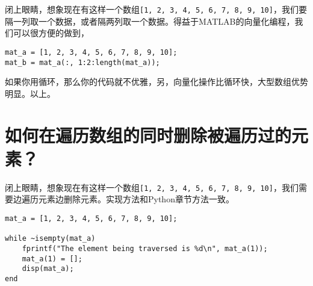 闭上眼睛，想象现在有这样一个数组\texttt{[1, 2, 3, 4, 5, 6, 7, 8, 9, 10]}，我们要隔一列取一个数据，或者隔两列取一个数据。得益于MATLAB的向量化编程，我们可以很方便的做到，

\begin{verbatim}
mat_a = [1, 2, 3, 4, 5, 6, 7, 8, 9, 10];
mat_b = mat_a(:, 1:2:length(mat_a));
\end{verbatim}

如果你用循环，那么你的代码就不优雅，另，向量化操作比循环快，大型数组优势明显。以上。

\section{如何在遍历数组的同时删除被遍历过的元素？}

闭上眼睛，想象现在有这样一个数组\texttt{[1, 2, 3, 4, 5, 6, 7, 8, 9, 10]}，我们需要边遍历元素边删除元素。实现方法和Python章节方法一致。

\begin{verbatim}
mat_a = [1, 2, 3, 4, 5, 6, 7, 8, 9, 10];

while ~isempty(mat_a)
    fprintf("The element being traversed is %d\n", mat_a(1));
    mat_a(1) = [];
    disp(mat_a);
end
\end{verbatim}



